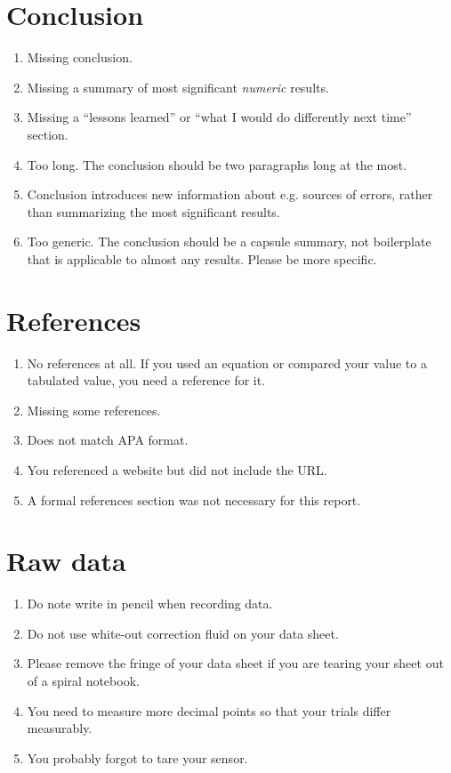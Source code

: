 \documentclass[12pt,letterpaper]{article}
\begin{document}
\begin{multicols}{2}
\section{Conclusion}

\begin{enumerate}[start=140]
  \item Missing conclusion.
  \item Missing a summary of most significant \emph{numeric} results.
  \item Missing a ``lessons learned'' or
    ``what I would do differently next time'' section.
  \item Too long.
    The conclusion should be two paragraphs long at the most.
  \item Conclusion introduces new information about e.g. sources of errors,
    rather than summarizing the most significant results.
  \item Too generic.
    The conclusion should be a capsule summary,
    not boilerplate that is applicable to almost any results.
    Please be more specific.
\end{enumerate}

\section{References}

\begin{enumerate}[start=150]
  \item No references at all.
    If you used an equation or compared your value to a tabulated value,
    you need a reference for it.
  \item Missing some references.
  \item Does not match APA format.
  \item You referenced a website but did not include the URL.
  \item A formal references section was not necessary for this report.
\end{enumerate}

\section*{Raw data}

\begin{enumerate}[start=160]
  \item Do note write in pencil when recording data.
  \item Do not use white-out correction fluid on your data sheet.
  \item Please remove the fringe of your data sheet
    if you are tearing your sheet out of a spiral notebook.
  \item You need to measure more decimal points
    so that your trials differ measurably.
  \item You probably forgot to tare your sensor.
\end{enumerate}

\end{multicols}
\end{document}
